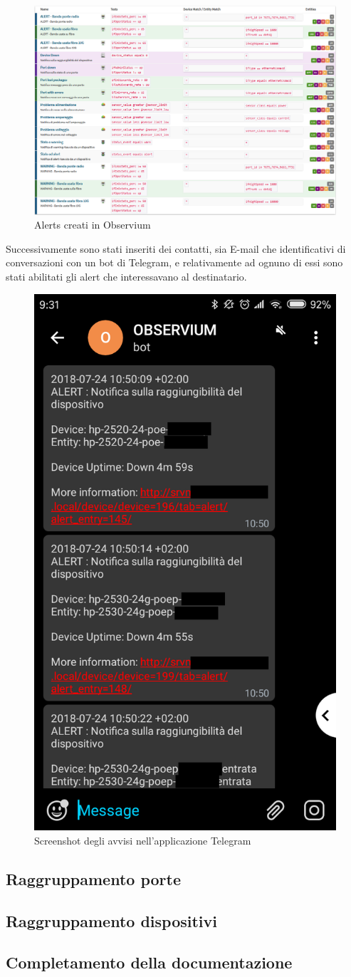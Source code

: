 \documentclass[Realizzazione.tex]{subfiles}
\begin{document}
\begin{figure}[H]
	\centering
	\includegraphics[width=1.1\linewidth]{"images/alerts"}
	\caption{Alerts creati in Observium}
	\label{fig:Alerts creati in Observium}
\end{figure}

Successivamente sono stati inseriti dei contatti, sia E-mail che identificativi di conversazioni con un bot di Telegram, e relativamente ad ognuno di essi sono stati abilitati gli alert che interessavano al destinatario.

\begin{figure}[H]
	\centering
	\includegraphics[width=0.4\linewidth]{"images/alerttelegram"}
	\caption{Screenshot degli avvisi nell'applicazione Telegram}
	\label{fig:Screenshot degli avvisi nell'applicazione Telegram}
\end{figure}

\subsection{Raggruppamento porte}


\subsection{Raggruppamento dispositivi}

\subsection{Completamento della documentazione}
	
\end{document}
